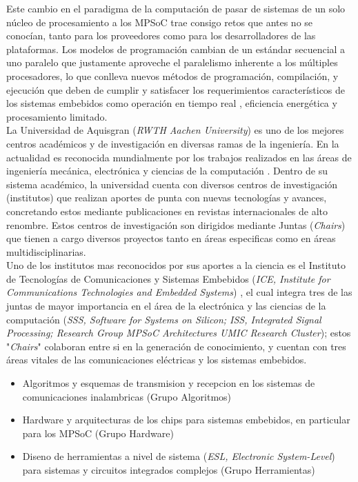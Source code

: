 \newpage
Este cambio en el paradigma de la computación de pasar de sistemas de un solo núcleo de procesamiento a los MPSoC trae consigo retos 
que antes no se conocían, tanto para los proveedores como para los desarrolladores de las plataformas. Los modelos de programación cambian 
de un estándar secuencial a uno paralelo que justamente aproveche el paralelismo inherente a los múltiples procesadores,
lo que conlleva nuevos métodos de programación, compilación, y ejecución que deben de cumplir y satisfacer los requerimientos 
característicos de los sistemas embebidos como operación en tiempo real \cite{LERTA_RT}, eficiencia energética y procesamiento limitado.\\

La Universidad de Aquisgran (\textit{RWTH Aachen University}) es uno de los mejores centros académicos y de investigación en diversas
ramas de la ingeniería. En la actualidad es reconocida mundialmente por los trabajos realizados en las áreas de ingeniería mecánica, 
electrónica y ciencias de la computación \cite{RWTH_AACHEN_REF}. Dentro de su sistema académico, la universidad cuenta con diversos centros
de investigación (institutos) que realizan aportes de punta con nuevas tecnologías y avances, concretando estos mediante publicaciones en revistas
internacionales de alto renombre. Estos centros de investigación son dirigidos mediante Juntas (\textit{Chairs}) 
que tienen a cargo diversos proyectos tanto en áreas especificas como en áreas multidisciplinarias.\\

Uno de los institutos mas reconocidos por sus aportes a la ciencia es el Instituto de Tecnologías de Comunicaciones y 
Sistemas Embebidos (\textit{ICE, Institute for Communications Technologies and Embedded Systems}) \cite{ICE_ABOUT}, 
el cual integra tres de las juntas de mayor importancia en el área de la electrónica y las ciencias 
de la computación (\textit{SSS, Software for Systems on Silicon; ISS, Integrated Signal Processing; Research Group 
MPSoC Architectures UMIC Research Cluster}); estos "\textit{Chairs}" colaboran entre si en la generación de conocimiento, y cuentan con 
tres áreas vitales de las comunicaciones eléctricas y los sistemas embebidos. 

\begin{itemize}
 \item Algoritmos y esquemas de transmision y recepcion en los sistemas de comunicaciones inalambricas (Grupo Algoritmos)
 \item Hardware y arquitecturas de los chips para sistemas embebidos, en particular para los MPSoC (Grupo Hardware)
 \item Diseno de herramientas a nivel de sistema (\textit{ESL, Electronic System-Level}) para sistemas y circuitos integrados complejos
 (Grupo Herramientas)
\end{itemize}

